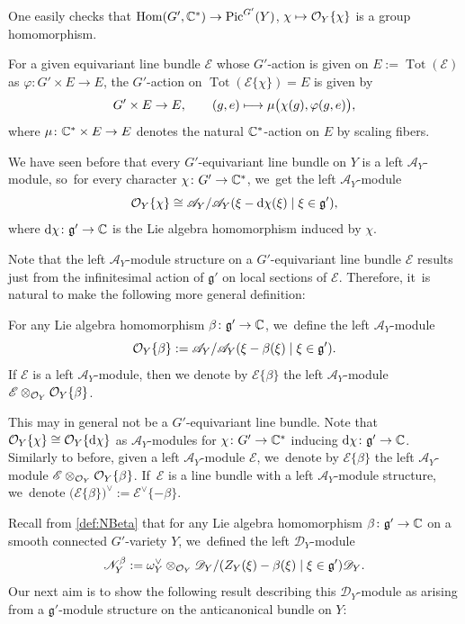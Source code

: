 \documentclass[11pt]{article}
\newcommand\mto{\mathchoice{\longmapsto}{\mapsto}{\mapsto}{\mapsto}}
\newcommand{\cA}{\mathscr{A}}
\newcommand{\frg}{\mathfrak{g}}
\DeclareMathOperator{\differential}{d\!}
\DeclareMathOperator{\Pic}{Pic}
\DeclareMathOperator{\Tot}{Tot}
\begin{document}
One easily checks that
$\operatorname{Hom}(G', \C^*) \to \Pic^{G'}(Y)$, $\chi \mto \O_Y\{\chi\}$ is a group homomorphism.

\begin{rmk}
For a given equivariant line bundle $\mathscr{E}$ whose $G'$-action is given on $E := \Tot(\mathscr{E})$ as $\varphi \colon G' \times E \to E$, the $G'$-action on $\Tot(\mathscr{E}\{\chi\}) = E$ is given by
\[
G' \times E \to E, \qquad (g,e) \mto \mu\big(\chi(g),\varphi(g,e)\big),
\]
where $\mu \colon {\mathbb C}^* \times E \to E$ denotes the natural ${\mathbb C}^*$-action on $E$ by scaling fibers.
\end{rmk}

We have seen before that every $G'$-equivariant line bundle on $Y$ is a left $\cA_Y$\nobreakdash-mod\-ule, so~for every character $\chi \colon G' \to {\mathbb C}^*$, we~get the left $\cA_Y$\nobreakdash-mod\-ule
\[
\O_Y\{\chi\} \cong \cA_Y/\cA_Y (\xi - \differential\chi(\xi) \mid \xi \in \frg'),
\]
where $\differential\chi \colon \frg' \to \C$ is the Lie algebra homomorphism induced by $\chi$.

Note that the left $\cA_Y$\nobreakdash-mod\-ule structure on a $G'$-equivariant line bundle $\mathscr{E}$ results just from the infinitesimal action of $\frg'$ on local sections of $\mathscr{E}$. Therefore, it~is natural to make the following more general definition:

\begin{dfn} For any Lie algebra homomorphism $\beta \colon \frg' \to \C$, we~define the left $\mathscr A_Y$\nobreakdash-mod\-ule
\[
\O_Y\{\beta\} := \cA_Y/\cA_Y (\xi - \beta(\xi) \mid \xi \in \frg').
\]
If $\mathscr E$ is a left $\cA_Y$\nobreakdash-mod\-ule, then we denote by $\mathscr E \{\beta\}$ the left $\cA_Y$\nobreakdash-mod\-ule $\mathscr{E} \otimes_{\mathcal{O}_Y} \mathcal{O}_Y\{\beta\}$.
\end{dfn}
This may in general not be a $G'$-equivariant line bundle. Note that $\O_Y\{\chi\} \cong \O_Y\{\differential \chi\}$ as $\cA_Y$\nobreakdash-mod\-ules for $\chi \colon G' \to {\mathbb C}^*$ inducing $\differential\chi \colon \frg' \to \C$. Similarly to before, given a left $\cA_Y$\nobreakdash-mod\-ule $\mathscr E$, we~denote by $\mathscr E \{\beta\}$ the left $\cA_Y$\nobreakdash-mod\-ule $\mathscr{E} \otimes_{\mathcal{O}_Y} \mathcal{O}_Y\{\beta\}$. If~$\mathscr E$ is a line bundle with a left $\cA_Y$\nobreakdash-mod\-ule structure, we~denote $\mathscr (\mathscr E\{\beta\})^\vee := \mathscr E^\vee\{-\beta\}$.

Recall from \cref{def:NBeta} that for any Lie algebra homomorphism $\beta \colon \frg' \to \C$ on a smooth connected $G'$-variety $Y$, we~defined the left $\mathscr{D}_Y$\nobreakdash-mod\-ule
\[
\mathscr{N}_{Y}^{\beta} := \omega_Y^\vee \otimes_{\O_Y} \mathscr{D}_Y / (Z_Y(\xi)-\beta(\xi) \mid \xi \in \frg') \mathscr{D}_Y.
\]
Our next aim is to show the following result describing this $\mathscr{D}_Y$\nobreakdash-mod\-ule as arising from a $\frg'$\nobreakdash-mod\-ule structure on the anticanonical bundle on $Y$:
\end{document}
